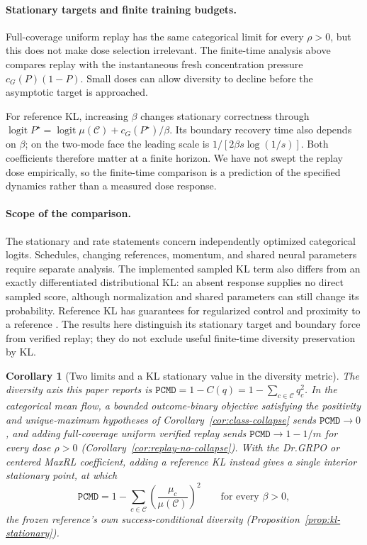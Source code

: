 \documentclass{article}
\newcommand{\enforcehalffinalproseline}{%
  \setlength{\parfillskip}{0pt plus .20\linewidth}}
\newcommand{\1}{\mathbf 1}
\newcommand{\pmd}{\texttt{PCMD}}
\newtheorem{corollary}[lemma]{Corollary}
\theoremstyle{remark}
\theoremstyle{definition}
\theoremstyle{plain}
\begin{document}
\paragraph{Stationary targets and finite training budgets.}
Full-coverage uniform replay has the same categorical limit for every
$\rho>0$, but this does not make dose selection irrelevant.
The finite-time analysis above compares replay with the instantaneous
fresh concentration pressure $c_G(P)(1-P)$. Small doses can allow diversity
to decline before the asymptotic target is approached.

For reference KL, increasing $\beta$ changes stationary correctness through
$\operatorname{logit}P^\star=\operatorname{logit}\mu(\mathcal C)+c_G(P^\star)/\beta$.
Its boundary recovery time also depends on $\beta$; on the two-mode face
the leading scale is $1/[2\beta s\log(1/s)]$.
Both coefficients therefore matter at a finite horizon. We have not swept
the replay dose empirically, so the finite-time comparison is a prediction of
the specified dynamics rather than a measured dose response.

\paragraph{Scope of the comparison.}
The stationary and rate statements concern independently optimized
categorical logits. Schedules, changing references, momentum, and shared
neural parameters require separate analysis. The implemented sampled KL
term also differs from an exactly differentiated distributional KL:
an absent response supplies no direct sampled score, although normalization
and shared parameters can still change its probability.
Reference KL has guarantees for regularized control and proximity to a
reference \citep{geist2019regmdp,vieillard2020kl}. The results here distinguish
its stationary target and boundary force from verified replay; they do not
exclude useful finite-time diversity preservation by KL.

\begin{corollary}[Two limits and a KL stationary value in the diversity metric]
\enforcehalffinalproseline
\label{cor:pmd-limits}
The diversity axis this paper reports is
$\pmd{}=1-C(q)=1-\sum_{c\in\mathcal C}q_c^2$. In the categorical mean flow, a
bounded outcome-binary objective satisfying the positivity and unique-maximum
hypotheses of Corollary~\ref{cor:class-collapse} sends $\pmd{}\to0$, and adding full-coverage uniform verified
replay sends $\pmd{}\to1-1/m$ for every dose $\rho>0$
(Corollary~\ref{cor:replay-no-collapse}). With the Dr.GRPO or centered MaxRL coefficient, adding a reference KL
instead gives a single interior stationary point, at which
\[
 \pmd{}=1-\sum_{c\in\mathcal C}
   \left(\frac{\mu_c}{\mu(\mathcal C)}\right)^{\!2}
 \qquad\text{for every }\beta>0,
\]
the frozen reference's own success-conditional diversity
(Proposition~\ref{prop:kl-stationary}).
\end{corollary}
\end{document}
